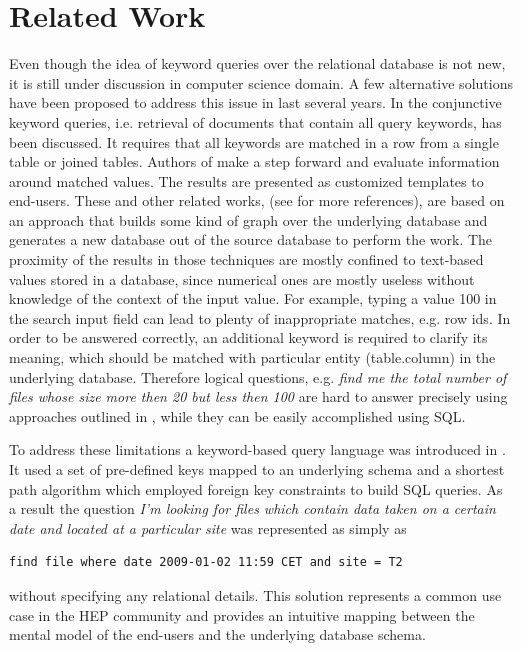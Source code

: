 \documentclass[3p,times]{elsarticle}
\begin{document}
\section{Related Work\label{RelatedWork}}
Even though the idea of keyword queries over the relational database
is not new, it is still under discussion in computer science domain.
A few alternative solutions have been proposed to address this issue
in last several years. In \cite{DBXplorer} the conjunctive keyword queries,
i.e. retrieval of documents that contain all query keywords, has
been discussed. It requires that all keywords are matched in a row from a
single table or joined tables. Authors of \cite{QueryAnswer} make a step forward
and evaluate information around matched values. The results are presented as
customized templates to end-users. 
These and other related works, (see \cite{DBXplorer, QueryAnswer} 
for more references), are based on an approach that builds some 
kind of graph over the underlying 
database and generates a new database out of the source database to perform the work.
The proximity of the results in those techniques are mostly confined to 
text-based values stored in a database, since numerical ones 
are mostly useless without knowledge of the context of the input value. 
For example, typing a value 100 in the search input field can lead to 
plenty of inappropriate matches, e.g. row ids. In order to be
answered correctly, an additional keyword is required to clarify its meaning, 
which should be matched with particular entity (table.column) in the 
underlying database. Therefore logical questions, e.g.
{\it find me the total number of files whose size more then 20 but less then 
100} are hard to answer precisely using approaches outlined in \cite{DBXplorer, QueryAnswer}, 
while they can be easily accomplished using SQL. 

To address these limitations a keyword-based query language was introduced in \cite{DBS-QL}.
It used a set of pre-defined keys mapped to an underlying schema and a shortest path
algorithm which employed foreign key constraints to build SQL queries. As a result
the question
{\it I'm looking for files which contain data taken on a certain date and located at
a particular site} was represented as simply as \cite{DBS-QL}
\begin{verbatim}
find file where date 2009-01-02 11:59 CET and site = T2
\end{verbatim}
without specifying any relational details.
This solution represents a common use case in the HEP community and provides
an intuitive mapping between the mental model of the end-users and 
the underlying database schema.
\end{document}
